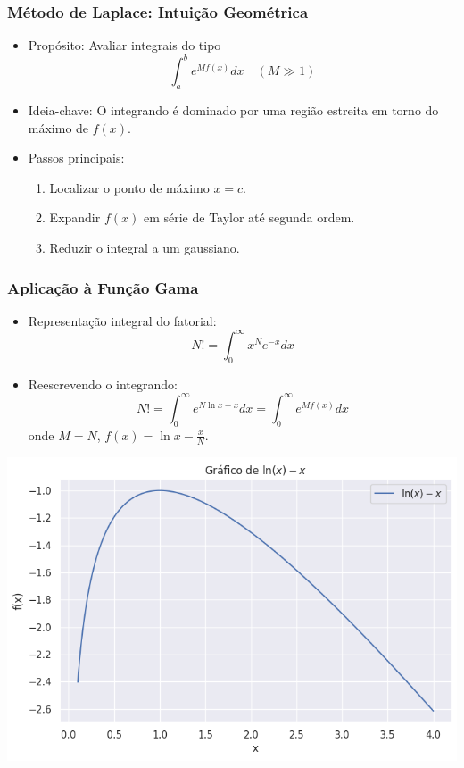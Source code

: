 \documentclass[11pt]{beamer}
\begin{document}
\begin{frame}
\frametitle{Método de Laplace: Intuição Geométrica}
\begin{itemize}
\item Propósito: Avaliar integrais do tipo
\[ \int_a^b e^{M f(x)} dx \quad (M \gg 1) \]
\item Ideia-chave: O integrando é dominado por uma região estreita em torno do máximo de \( f(x) \).

\item Passos principais:
\begin{enumerate}
\item Localizar o ponto de máximo \( x = c \).
\item Expandir \( f(x) \) em série de Taylor até segunda ordem.
\item Reduzir o integral a um gaussiano.
\end{enumerate}
\end{itemize}
\end{frame}

\begin{frame}
\frametitle{Aplicação à Função Gama}
\begin{itemize}
\item Representação integral do fatorial:
\[ N! = \int_0^\infty x^N e^{-x} dx \]
\item Reescrevendo o integrando:
\[
N! = \int_0^\infty e^{N \ln x - x} dx = \int_0^\infty e^{M f(x)} dx
\]
onde \( M = N \), \( f(x) = \ln x - \frac{x}{N} \).
\end{itemize}
\end{frame}

\begin{frame}
  \includegraphics[scale=0.5]{laplace.png}
\end{frame}
\end{document}
